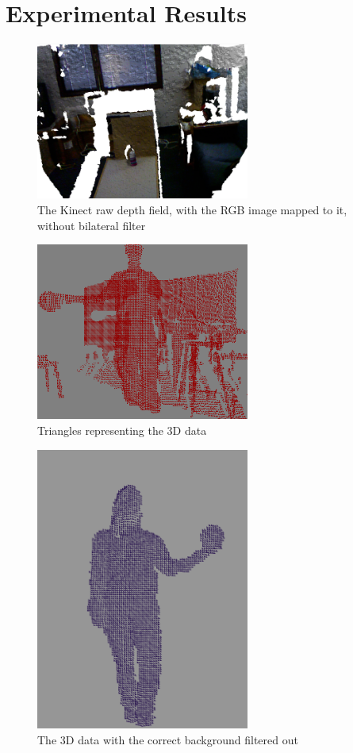 \documentclass[12pt,twocolumn]{article}
\begin{document}
\section{Experimental Results}

\begin{figure}[H]
\centering
\includegraphics[width=70mm]{kinectwaterbottle.png}
\caption{The Kinect raw depth field, with the RGB image mapped to it, without bilateral filter}
\label{waterbot}
\end{figure}

\begin{figure}[H]
\centering
\includegraphics[width=70mm]{3dtriangles.png}
\caption{Triangles representing the 3D data}
\label{3dtri}
\end{figure}

\begin{figure}[H]
\centering
\includegraphics[width=70mm]{cadyholdingball.png}
\caption{The 3D data with the correct background filtered out}
\label{balls2}
\end{figure}
\end{document}
